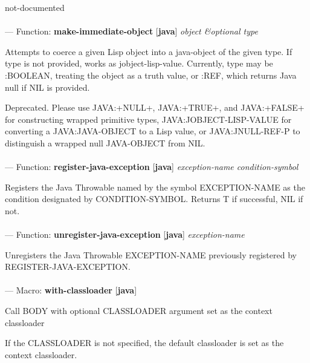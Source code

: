 \begin{adjustwidth}{5em}{5em}
not-documented
\end{adjustwidth}

\paragraph{}
\label{JAVA:MAKE-IMMEDIATE-OBJECT}
--- Function: \textbf{make-immediate-object} [\textbf{java}] \textit{object \&optional type}

\begin{adjustwidth}{5em}{5em}
Attempts to coerce a given Lisp object into a java-object of the
given type.  If type is not provided, works as jobject-lisp-value.
Currently, type may be :BOOLEAN, treating the object as a truth value,
or :REF, which returns Java null if NIL is provided.

Deprecated.  Please use JAVA:+NULL+, JAVA:+TRUE+, and JAVA:+FALSE+ for
constructing wrapped primitive types, JAVA:JOBJECT-LISP-VALUE for converting a
JAVA:JAVA-OBJECT to a Lisp value, or JAVA:JNULL-REF-P to distinguish a wrapped
null JAVA-OBJECT from NIL.
\end{adjustwidth}

\paragraph{}
\label{JAVA:REGISTER-JAVA-EXCEPTION}
--- Function: \textbf{register-java-exception} [\textbf{java}] \textit{exception-name condition-symbol}

\begin{adjustwidth}{5em}{5em}
Registers the Java Throwable named by the symbol EXCEPTION-NAME as the condition designated by CONDITION-SYMBOL.  Returns T if successful, NIL if not.
\end{adjustwidth}

\paragraph{}
\label{JAVA:UNREGISTER-JAVA-EXCEPTION}
--- Function: \textbf{unregister-java-exception} [\textbf{java}] \textit{exception-name}

\begin{adjustwidth}{5em}{5em}
Unregisters the Java Throwable EXCEPTION-NAME previously registered by REGISTER-JAVA-EXCEPTION.
\end{adjustwidth}

\paragraph{}
\label{JAVA:WITH-CLASSLOADER}
--- Macro: \textbf{with-classloader} [\textbf{java}] \textit{}

\begin{adjustwidth}{5em}{5em}
Call BODY with optional CLASSLOADER argument set as the context classloader

If the CLASSLOADER is not specified, the default classloader is set as
the context classloader.
\end{adjustwidth}

